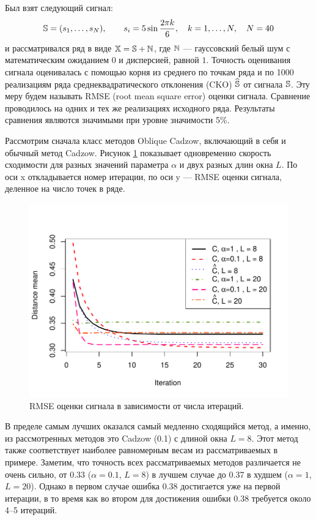 \documentclass[12pt,a4paper,fleqn,leqno]{article}
\begin{document}
Был взят следующий сигнал:
\begin{equation*}
\mathbb{S} = (s_{1}, \ldots, s_N), \qquad s_{i} = 5\sin{\frac{2 \pi k}{6}}, \quad k = 1, \ldots, N, \quad N = 40
\end{equation*}
и рассматривался ряд в виде $\mathbb{X} = \mathbb{S} + \mathbb{N}$, где  $\mathbb{N}$ --- гауссовский белый шум с математическим ожиданием $0$ и дисперсией, равной $1$.
Точность оценивания сигнала оценивалась с помощью корня из среднего по точкам ряда и по 1000 реализациям ряда среднеквадратического отклонения (CKO)
$\widehat{\mathbb{S}}$ от сигнала $\mathbb{S}$.
Эту меру будем называть RMSE (root mean square error) оценки сигнала.
Сравнение проводилось на одних и тех же реализациях исходного ряда. Результаты сравнения являются значимыми
при уровне значимости 5\%.

Рассмотрим сначала класс методов Oblique Cadzow, включающий в себя и обычный метод Cadzow.
Рисунок \ref{img_cadzowspeed2} показывает одновременно скорость сходимости для разных значений параметра $\alpha$ и двух разных длин окна $L$.
По оси x откладывается номер итерации, по оси y --- RMSE оценки сигнала, деленное на число точек в ряде.
\begin{figure}[!hhh]
\begin{center}
\includegraphics[width = \textwidth]{cadzowspeed_2.pdf}
\caption{RMSE оценки сигнала в зависимости от числа итераций.}
\label{img_cadzowspeed2}
\end{center}
\end{figure}

В пределе самым лучших оказался самый медленно сходящийся метод, а именно, из рассмотренных методов это Cadzow (0.1) с длиной окна $L=8$.
Этот метод также соответствует наиболее равномерным весам из рассматриваемых в примере.
Заметим, что точность всех рассматриваемых методов различается не очень сильно, от 0.33 ($\alpha=0.1$, $L=8$) в лучшем случае до 0.37 в худшем
($\alpha=1$, $L=20$). Однако в первом случае ошибка 0.38 достигается уже на первой итерации, в то время как во втором для
достижения ошибки 0.38 требуется около 4--5 итераций.
\end{document}
